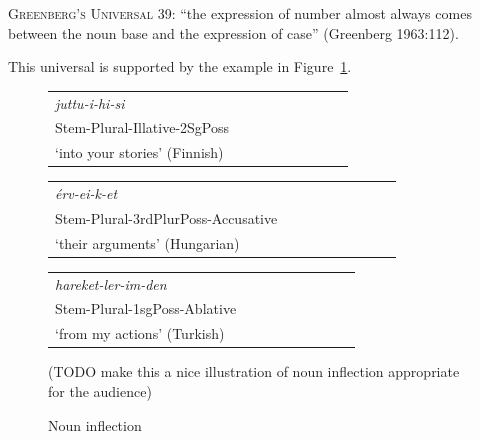 \documentclass[11pt,letterpaper]{article}
\newcommand\mhahn[1]{{\color{red}(#1)}}
\begin{document}
\begin{adjustwidth}{6em}{6em}
\textsc{Greenberg's Universal 39}:
``the expression of number almost always comes between the noun base and the expression of case'' (Greenberg 1963:112).
\end{adjustwidth}

This universal is supported by the example in Figure~\ref{fig:noun-inflection}.



\begin{figure}
\begin{tabular}{lllllllll}
\textit{juttu-i-hi-si} \\
Stem-Plural-Illative-2SgPoss \\
`into your stories' (Finnish)
\end{tabular}
\begin{tabular}{lllllllll}
\textit{érv-ei-k-et} \\
Stem-Plural-3rdPlurPoss-Accusative \\
`their arguments' (Hungarian)
\end{tabular}
\begin{tabular}{lllllllll}
\textit{hareket-ler-im-den} \\
Stem-Plural-1sgPoss-Ablative\\
`from my actions' (Turkish) \\
\end{tabular}

\mhahn{TODO make this a nice illustration of noun inflection appropriate for the audience}

\caption{Noun inflection}\label{fig:noun-inflection}
\end{figure}
\end{document}
